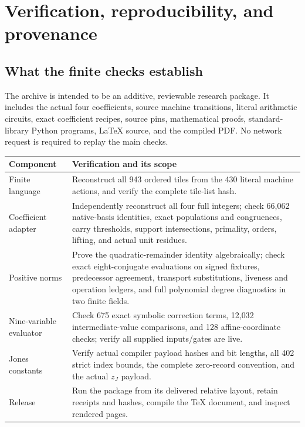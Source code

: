 \section{Verification, reproducibility, and provenance}

\subsection{What the finite checks establish}

The archive is intended to be an additive, reviewable research package.
It includes the actual four coefficients, source machine transitions,
literal arithmetic circuits, exact coefficient recipes, source pins,
mathematical proofs, standard-library Python programs, LaTeX source, and
the compiled PDF. No network request is required to replay the main checks.

\begin{longtable}{@{}>{\raggedright\arraybackslash}p{}>{\raggedright\arraybackslash}p{}@{}}
\toprule
Component & Verification and its scope\\
\midrule
\endhead
Finite language & Reconstruct all 943 ordered tiles from the 430 literal
machine actions, and verify the complete tile-list hash.\\
Coefficient adapter & Independently reconstruct all four full integers;
check 66,062 native-basis identities, exact populations and congruences,
carry thresholds, support intersections, primality, orders, lifting, and
actual unit residues.\\
Positive norms & Prove the quadratic-remainder identity algebraically;
check exact eight-conjugate evaluations on signed fixtures, predecessor
agreement, transport substitutions, liveness and operation ledgers, and
full polynomial degree diagnostics in two finite fields.\\
Nine-variable evaluator & Check 675 exact symbolic correction terms,
12,032 intermediate-value comparisons, and 128 affine-coordinate checks;
verify all supplied inputs/gates are live.\\
Jones constants & Verify actual compiler payload hashes and bit lengths,
all 402 strict index bounds, the complete zero-record convention, and
the actual $z_J$ payload.\\
Release & Run the package from its delivered relative layout, retain
receipts and hashes, compile the TeX document, and inspect rendered pages.\\
\bottomrule
\end{longtable}

